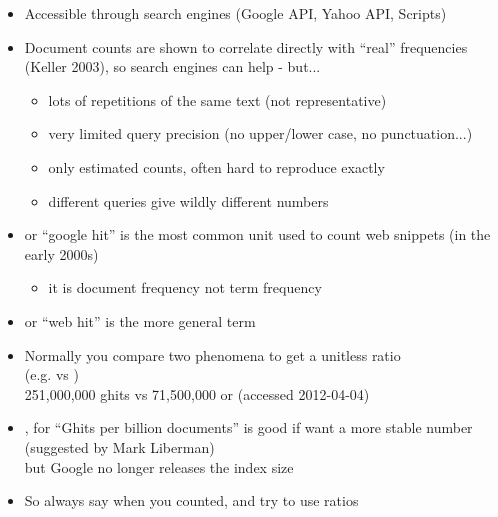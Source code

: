 \documentclass[a4paper,landscape,headrule,footrule,xetex]{foils}
\begin{document}
\begin{itemize}
\item Accessible through search engines (Google API, Yahoo API, Scripts)

\item Document counts are shown to correlate directly with ``real''
  frequencies (Keller 2003), so search engines can help - but...
  \begin{itemize}
  \item lots of repetitions of the same text (not representative)
  \item very limited query precision (no upper/lower case, no punctuation...)
  \item only estimated counts, often hard to reproduce exactly
  \item different queries give wildly different numbers
  \end{itemize}
\end{itemize}


\begin{itemize}\addtolength{\itemsep}{-1ex}
\item {} or ``google hit'' is the most common unit used to
  count web snippets (in the early 2000s)
  \begin{itemize}
  \item it is document frequency not term frequency
  \end{itemize}
\item {} or ``web hit'' is the more general term
\item Normally you compare two phenomena to get a unitless ratio
  \\(e.g.  vs )
  \\ 251,000,000 ghits vs 71,500,000 or  (accessed 2012-04-04)
\item {}, for ``Ghits per billion documents'' is good if want a
  more stable number (suggested by Mark Liberman)
\\ but Google no longer releases the index size 
\item So always say when you counted, and try to use ratios
\end{itemize}
\end{document}
